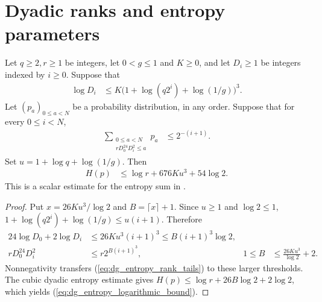 \section{Dyadic ranks and entropy parameters}

\begin{lemma}
    \label{thm:dg_logarithmic_rank_tail_entropy}
    \leanok
    Let $q\ge2,r\ge1$ be integers, let $0<g\le1$ and $K\ge0$, and let
    $D_i\ge1$ be integers indexed by $i\ge0$. Suppose that
    \begin{align}
        \log D_i & \le K\bigl(1+\log(q2^i)+\log(1/g)\bigr)^3.
        \label{eq:dg_entropy_log_ranks}
    \end{align}
    Let $(p_a)_{0\le a<N}$ be a probability distribution, in any order.
    Suppose that for every $0\le i<N$,
    \begin{align}
        \sum_{\substack{0\le a<N \\rD_0^{24}D_i^2\le a}}p_a
         & \le2^{-(i+1)}.
        \label{eq:dg_entropy_rank_tails}
    \end{align}
    Set $u=1+\log q+\log(1/g)$. Then
    \begin{align}
        H(p) & \le\log r+676Ku^3+54\log2.
        \label{eq:dg_entropy_logarithmic_bound}
    \end{align}
    This is a scalar estimate for the entropy sum in
    \cite[proof of Theorem~4.9]{Arad2016RigorousRG}.
\end{lemma}
\begin{proof}
    \leanok
    Put $x=26Ku^3/\log2$ and $B=\lceil x\rceil+1$.
    Since $u\ge1$ and $\log2\le1$,
    $1+\log(q2^i)+\log(1/g)\le u(i+1)$.
    Therefore
    \begin{align*}
        24\log D_0+2\log D_i & \le26Ku^3(i+1)^3\le B(i+1)^3\log2,   \\
        rD_0^{24}D_i^2       & \le r2^{B(i+1)^3},                 &
        1\le B               & \le\frac{26Ku^3}{\log2}+2.
    \end{align*}
    Nonnegativity transfers (\ref{eq:dg_entropy_rank_tails}) to these larger
    thresholds. The cubic dyadic entropy estimate
    \cite[``Entropy from cubic dyadic rank tails'']{QICLean2026Blueprint} gives
    $H(p)\le\log r+26B\log2+2\log2$, which yields
    (\ref{eq:dg_entropy_logarithmic_bound}).
\end{proof}

